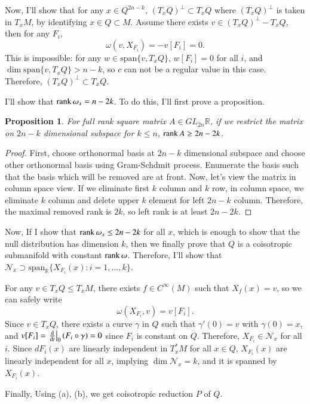 \documentclass[a4paper, 12pt]{article}
\theoremstyle{Mydefinition}
\theoremstyle{Mytheorem}
\newtheorem{proposition}[statement]{Proposition}
\begin{document}
\begin{enumerate}
    Now, I'll show that for any $x \in Q^{2n-k}$, $(T_xQ)^\perp \subset T_xQ$ where $(T_xQ)^\perp$ is taken in $T_xM$, by identifying $x\in Q\subset M$. Assume there exists $v\in (T_xQ)^\perp - T_xQ$, then for any $F_i$,
    \begin{equation*}
        \omega(v, X_{F_i}) = -v[F_i] = 0.
    \end{equation*}
    This is impossible: for any $w\in \mathrm{span}\{v, T_xQ\}$, $w[F_i] = 0$ for all $i$, and $\dim\mathrm{span}\{v, T_xQ\}>n-k$, so $c$ can not be a regular value in this case. Therefore, $(T_xQ)^\perp \subset T_xQ$.
    
    I'll show that $\rank \omega_x = n-2k$. To do this, I'll first prove a proposition.
    \begin{proposition}
        For full rank square matrix $A\in GL_{2n}\mathbb{R}$, if we restrict the matrix on $2n-k$ dimensional subspace for $k \leq n$, $\rank A\geq 2n-2k$.
    \end{proposition}
    \begin{proof}
    First, choose orthonormal basis at $2n-k$ dimensional subspace and choose other orthonormal basis using Gram-Schdmit process. Enumerate the basis such that the basis which will be removed are at front. Now, let's view the matrix in column space view. If we eliminate first $k$ column and $k$ row, in column space, we eliminate $k$ column and delete upper $k$ element for left $2n-k$ column. Therefore, the maximal removed rank is $2k$, so left rank is at least $2n-2k$.
    \end{proof}
    Now, If I show that $\rank \omega_x\leq 2n-2k$ for all $x$, which is enough to show that the null distribution has dimension $k$, then we finally prove that $Q$ is a coisotropic submanifold with constant $\rank \omega$. Therefore, I'll show that $\mathcal{N}_x \supset \mathrm{span}_\mathbb{R}\{X_{F_i}(x):i=1,\ldots, k\}$.
    
    For any $v\in T_xQ\leq T_xM$, there exists $f\in C^\infty(M)$ such that $X_f(x) = v$, so we can safely write
    \begin{equation*}
        \omega(X_{F_i}, v) = v[F_i].
    \end{equation*}
    Since $v\in T_xQ$, there exists a curve $\gamma$ in $Q$ such that $\gamma'(0) = v$ with $\gamma(0) = x$, and $v[F_i] = \left.\dv{t}\right|_{0}(F_i\circ \gamma) = 0$ since $F_i$ is constant on $Q$. Therefore, $X_{F_i}\in \mathcal{N}_x$ for all $i$. Since $dF_i(x)$ are linearly independent in $T_x^*M$ for all $x\in Q$, $X_{F_i}(x)$ are linearly independent for all $x$, implying $\dim \mathcal{N}_x = k$, and it is spanned by $X_{F_i}(x)$. 
    
    Finally, Using (a), (b), we get coisotropic reduction $P$ of $Q$.
\end{enumerate}
\end{document}
